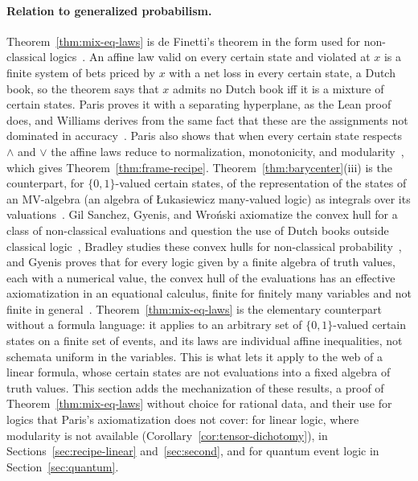 \paragraph{Relation to generalized probabilism.}
Theorem~\ref{thm:mix-eq-laws} is de Finetti's theorem in the form used
for non-classical logics~\cite{paris2001,williams2012}. An affine law
valid on every certain state and violated at $x$ is a finite system of
bets priced by $x$ with a net loss in every certain state, a Dutch book,
so the theorem says that $x$ admits no Dutch book iff it is a mixture of
certain states. Paris proves it with a separating hyperplane, as the Lean
proof does, and Williams derives from the same fact that these are the
assignments not dominated in accuracy~\cite{williams2012}. Paris also
shows that when every certain state respects $\wedge$ and $\vee$ the
affine laws reduce to normalization, monotonicity, and
modularity~\cite{paris2001}, which gives Theorem~\ref{thm:frame-recipe}.
Theorem~\ref{thm:barycenter}(iii) is the counterpart, for
$\{0,1\}$-valued certain states, of the representation of the states of
an MV-algebra (an algebra of \L{}ukasiewicz many-valued logic) as
integrals over its
valuations~\cite{kroupa2006,panti2008,kuhr-mundici2007}. Gil Sanchez, Gyenis, and Wro\'nski axiomatize the convex hull for a class
of non-classical evaluations and question the use of Dutch books outside
classical logic~\cite{gilsanchez2022}, Bradley studies these convex hulls
for non-classical probability~\cite{bradley2016}, and Gyenis proves that for
every logic given by a finite algebra of truth values, each with a
numerical value, the convex hull of the evaluations has an effective
axiomatization in an equational calculus, finite for finitely many
variables and not finite in general~\cite{gyenis2025}.
Theorem~\ref{thm:mix-eq-laws} is the elementary counterpart without a
formula language: it applies to an arbitrary set of $\{0,1\}$-valued
certain states on a finite set of events, and its laws are individual
affine inequalities, not schemata uniform in the variables. This is what
lets it apply to the web of a linear formula, whose certain states are
not evaluations into a fixed algebra of truth values. This section
adds the mechanization of these results, a proof of Theorem~\ref{thm:mix-eq-laws}
without choice for rational data, and their use for logics that
Paris's axiomatization does not cover: for linear logic, where modularity is not available
(Corollary~\ref{cor:tensor-dichotomy}), in Sections~\ref{sec:recipe-linear}
and~\ref{sec:second}, and for quantum event logic in
Section~\ref{sec:quantum}.

